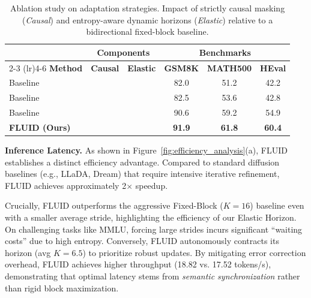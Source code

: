 \documentclass[11pt]{article}
\newcommand{\cmark}{\ding{51}}%
\newcommand{\xmark}{\ding{55}}%
\begin{document}
\begin{table}[h]
\centering
\small
\setlength{\tabcolsep}{1pt}
\begin{tabular}{lccccc}
\toprule
& \multicolumn{2}{c}{\textbf{Components}} & \multicolumn{3}{c}{\textbf{Benchmarks}} \\
\cmidrule(lr){2-3} \cmidrule(lr){4-6}
\textbf{Method} & \textbf{Causal} & \textbf{Elastic} & \textbf{GSM8K} & \textbf{MATH500} & \textbf{HEval}\\
\midrule
Baseline & \xmark & \xmark & 82.0 & 51.2 & 42.2 \\
Baseline & \xmark & \cmark & 82.5 & 53.6 & 42.8 \\
Baseline & \cmark & \xmark & 90.6 & 59.2 & 54.9 \\
\rowcolor{rowpurple}
\textbf{FLUID (Ours)} & \cmark & \cmark & \textbf{91.9} & \textbf{61.8} & \textbf{60.4} \\
\bottomrule
\end{tabular}
\caption{Ablation study on adaptation strategies. Impact of strictly causal masking (\textit{Causal}) and entropy-aware dynamic horizons (\textit{Elastic}) relative to a bidirectional fixed-block baseline.}
\label{tab:ablation}
\end{table}

\textbf{Inference Latency.}
As shown in Figure~\ref{fig:efficiency_analysis}(a), FLUID establishes a distinct efficiency advantage. Compared to standard diffusion baselines (e.g., LLaDA, Dream) that require intensive iterative refinement, FLUID achieves approximately 2$\times$ speedup.

Crucially, FLUID outperforms the aggressive Fixed-Block ($K=16$) baseline even with a smaller average stride, highlighting the efficiency of our Elastic Horizon. On challenging tasks like MMLU, forcing large strides incurs significant ``waiting costs'' due to high entropy. Conversely, FLUID autonomously contracts its horizon (avg $K=6.5$) to prioritize robust updates. By mitigating error correction overhead, FLUID achieves higher throughput (18.82 vs. 17.52 tokens/s), demonstrating that optimal latency stems from \textit{semantic synchronization} rather than rigid block maximization.
\end{document}
